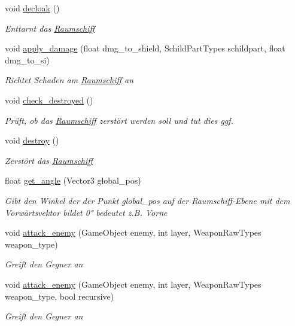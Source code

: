 \begin{DoxyCompactItemize}
void \hyperlink{class_spaceship_a46d165fefc78bd0cd729429b59a6bbb6}{decloak} ()
\begin{DoxyCompactList}\small\item\em Enttarnt das \hyperlink{class_raumschiff}{Raumschiff} \end{DoxyCompactList}\item 
void \hyperlink{class_spaceship_aec76ac225db6e42b52afb3aac04f7cad}{apply\+\_\+damage} (float dmg\+\_\+to\+\_\+shield, Schild\+Part\+Types schildpart, float dmg\+\_\+to\+\_\+si)
\begin{DoxyCompactList}\small\item\em Richtet Schaden am \hyperlink{class_raumschiff}{Raumschiff} an \end{DoxyCompactList}\item 
void \hyperlink{class_spaceship_a3f59582cf969851ab6633b4cf1047f20}{check\+\_\+destroyed} ()
\begin{DoxyCompactList}\small\item\em Prüft, ob das \hyperlink{class_raumschiff}{Raumschiff} zerstört werden soll und tut dies ggf. \end{DoxyCompactList}\item 
void \hyperlink{class_spaceship_a720b65b98cede503822fcb0141873f97}{destroy} ()
\begin{DoxyCompactList}\small\item\em Zerstört das \hyperlink{class_raumschiff}{Raumschiff} \end{DoxyCompactList}\item 
float \hyperlink{class_spaceship_a8cfcff835d6cba6b9fb8aa6841aa0cba}{get\+\_\+angle} (Vector3 global\+\_\+pos)
\begin{DoxyCompactList}\small\item\em Gibt den Winkel der der Punkt global\+\_\+pos auf der Raumschiff-\/\+Ebene mit dem Vorwärtsvektor bildet 0° bedeutet z.\+B. Vorne \end{DoxyCompactList}\item 
void \hyperlink{class_spaceship_abe51aab2bda242c27d475e50685bda63}{attack\+\_\+enemy} (Game\+Object enemy, int layer, Weapon\+Raw\+Types weapon\+\_\+type)
\begin{DoxyCompactList}\small\item\em Greift den Gegner an \end{DoxyCompactList}\item 
void \hyperlink{class_spaceship_a4bce8027749e4c12088266071ba6a5cc}{attack\+\_\+enemy} (Game\+Object enemy, int layer, Weapon\+Raw\+Types weapon\+\_\+type, bool recursive)
\begin{DoxyCompactList}\small\item\em Greift den Gegner an \end{DoxyCompactList}\end{DoxyCompactItemize}
